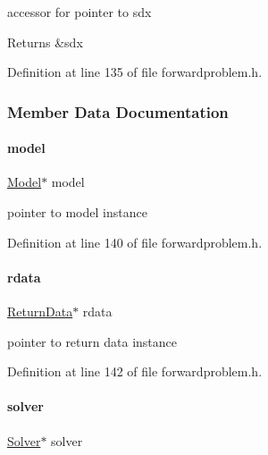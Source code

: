 accessor for pointer to sdx \begin{DoxyReturn}{Returns}
\&sdx 
\end{DoxyReturn}


Definition at line 135 of file forwardproblem.\+h.



\subsubsection{Member Data Documentation}
\mbox{\label{classamici_1_1_forward_problem_a7b56c3ca57dde73bdbc8dbe9772bca19}} 
\paragraph{\texorpdfstring{model}{model}}
{\footnotesize\ttfamily \mbox{\hyperlink{classamici_1_1_model}{Model}}$\ast$ model}

pointer to model instance 

Definition at line 140 of file forwardproblem.\+h.

\mbox{\label{classamici_1_1_forward_problem_a4c0807651f0594a186e8856f22e442cc}} 
\paragraph{\texorpdfstring{rdata}{rdata}}
{\footnotesize\ttfamily \mbox{\hyperlink{classamici_1_1_return_data}{Return\+Data}}$\ast$ rdata}

pointer to return data instance 

Definition at line 142 of file forwardproblem.\+h.

\mbox{\label{classamici_1_1_forward_problem_ae1ad25a4dd6b076c27672dc94d11dad0}} 
\paragraph{\texorpdfstring{solver}{solver}}
{\footnotesize\ttfamily \mbox{\hyperlink{classamici_1_1_solver}{Solver}}$\ast$ solver}

